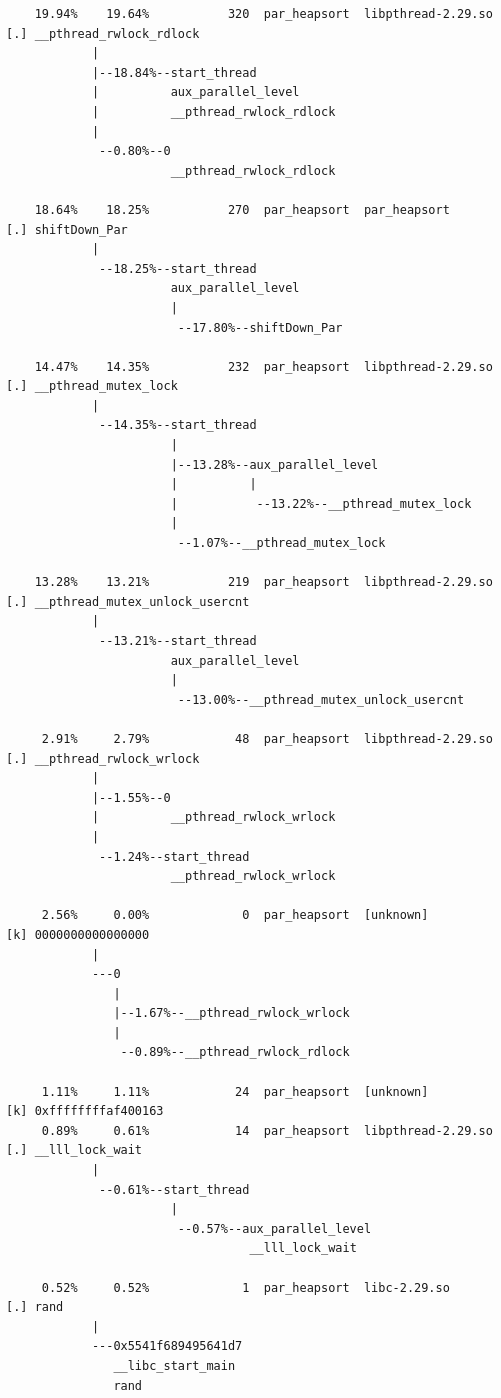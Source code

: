 \documentclass{article}
\begin{document}
\begin{verbatim}
    19.94%    19.64%           320  par_heapsort  libpthread-2.29.so  [.] __pthread_rwlock_rdlock
            |
            |--18.84%--start_thread
            |          aux_parallel_level
            |          __pthread_rwlock_rdlock
            |
             --0.80%--0
                       __pthread_rwlock_rdlock

    18.64%    18.25%           270  par_heapsort  par_heapsort        [.] shiftDown_Par
            |
             --18.25%--start_thread
                       aux_parallel_level
                       |
                        --17.80%--shiftDown_Par

    14.47%    14.35%           232  par_heapsort  libpthread-2.29.so  [.] __pthread_mutex_lock
            |
             --14.35%--start_thread
                       |
                       |--13.28%--aux_parallel_level
                       |          |
                       |           --13.22%--__pthread_mutex_lock
                       |
                        --1.07%--__pthread_mutex_lock

    13.28%    13.21%           219  par_heapsort  libpthread-2.29.so  [.] __pthread_mutex_unlock_usercnt
            |
             --13.21%--start_thread
                       aux_parallel_level
                       |
                        --13.00%--__pthread_mutex_unlock_usercnt

     2.91%     2.79%            48  par_heapsort  libpthread-2.29.so  [.] __pthread_rwlock_wrlock
            |
            |--1.55%--0
            |          __pthread_rwlock_wrlock
            |
             --1.24%--start_thread
                       __pthread_rwlock_wrlock

     2.56%     0.00%             0  par_heapsort  [unknown]           [k] 0000000000000000
            |
            ---0
               |
               |--1.67%--__pthread_rwlock_wrlock
               |
                --0.89%--__pthread_rwlock_rdlock

     1.11%     1.11%            24  par_heapsort  [unknown]           [k] 0xffffffffaf400163
     0.89%     0.61%            14  par_heapsort  libpthread-2.29.so  [.] __lll_lock_wait
            |
             --0.61%--start_thread
                       |
                        --0.57%--aux_parallel_level
                                  __lll_lock_wait

     0.52%     0.52%             1  par_heapsort  libc-2.29.so        [.] rand
            |
            ---0x5541f689495641d7
               __libc_start_main
               rand


\end{verbatim}
\end{document}
